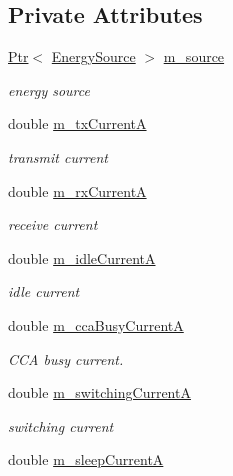 \subsection*{Private Attributes}
\begin{DoxyCompactItemize}
\item 
\hyperlink{classns3_1_1Ptr}{Ptr}$<$ \hyperlink{classns3_1_1EnergySource}{Energy\+Source} $>$ \hyperlink{classns3_1_1WifiRadioEnergyModel_a4d8a626e91ba3c7b337df91071380d34}{m\+\_\+source}
\begin{DoxyCompactList}\small\item\em energy source \end{DoxyCompactList}\item 
double \hyperlink{classns3_1_1WifiRadioEnergyModel_a7875a6969770435f031014f41725dea5}{m\+\_\+tx\+CurrentA}
\begin{DoxyCompactList}\small\item\em transmit current \end{DoxyCompactList}\item 
double \hyperlink{classns3_1_1WifiRadioEnergyModel_ac96a97fe3fd0c6b69cdcc976de440c43}{m\+\_\+rx\+CurrentA}
\begin{DoxyCompactList}\small\item\em receive current \end{DoxyCompactList}\item 
double \hyperlink{classns3_1_1WifiRadioEnergyModel_a0d7942dec1faf5c3ecc7c0f908280bc2}{m\+\_\+idle\+CurrentA}
\begin{DoxyCompactList}\small\item\em idle current \end{DoxyCompactList}\item 
double \hyperlink{classns3_1_1WifiRadioEnergyModel_a23a8b18e636106cf6655a279de953b08}{m\+\_\+cca\+Busy\+CurrentA}
\begin{DoxyCompactList}\small\item\em C\+CA busy current. \end{DoxyCompactList}\item 
double \hyperlink{classns3_1_1WifiRadioEnergyModel_afb9d3996210a3d341070e9b08ca3609b}{m\+\_\+switching\+CurrentA}
\begin{DoxyCompactList}\small\item\em switching current \end{DoxyCompactList}\item 
double \hyperlink{classns3_1_1WifiRadioEnergyModel_a42b305809982bb48a4c6ff3ca20614a4}{m\+\_\+sleep\+CurrentA}

\end{DoxyCompactItemize}
